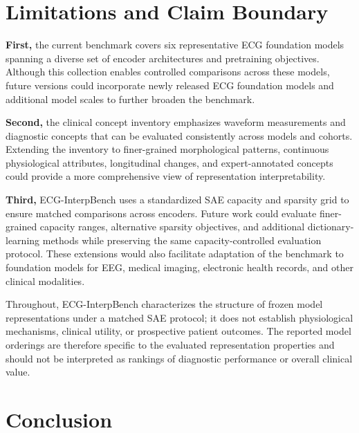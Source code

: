 \section{Limitations and Claim Boundary}

\textbf{First,} the current benchmark covers six representative ECG foundation models spanning a diverse set of encoder architectures and pretraining objectives. Although this collection enables controlled comparisons across these models, future versions could incorporate newly released ECG foundation models and additional model scales to further broaden the benchmark.

\textbf{Second,} the clinical concept inventory emphasizes waveform measurements and diagnostic concepts that can be evaluated consistently across models and cohorts. Extending the inventory to finer-grained morphological patterns, continuous physiological attributes, longitudinal changes, and expert-annotated concepts could provide a more comprehensive view of representation interpretability.

\textbf{Third,} ECG-InterpBench uses a standardized SAE capacity and sparsity grid to ensure matched comparisons across encoders. Future work could evaluate finer-grained capacity ranges, alternative sparsity objectives, and additional dictionary-learning methods while preserving the same capacity-controlled evaluation protocol. These extensions would also facilitate adaptation of the benchmark to foundation models for EEG, medical imaging, electronic health records, and other clinical modalities.

Throughout, ECG-InterpBench characterizes the structure of frozen model representations under a matched SAE protocol; it does not establish physiological mechanisms, clinical utility, or prospective patient outcomes. The reported model orderings are therefore specific to the evaluated representation properties and should not be interpreted as rankings of diagnostic performance or overall clinical value.

\FloatBarrier

\section{Conclusion}


